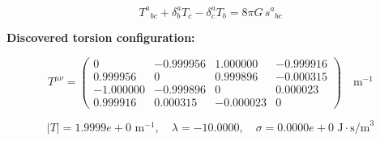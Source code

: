 
\begin{equation}
  T^a{}_{bc} + \delta^a_b T_c - \delta^a_c T_b = 8\pi G \, s^a{}_{bc}
\end{equation}

\textbf{Discovered torsion configuration:}

\begin{equation}
  T^{\mu\nu} = \begin{pmatrix}
    0 & -0.999956 & 1.000000 & -0.999916 \\
    0.999956 & 0 & 0.999896 & -0.000315 \\
    -1.000000 & -0.999896 & 0 & 0.000023 \\
    0.999916 & 0.000315 & -0.000023 & 0
  \end{pmatrix} \quad \text{m}^{-1}
\end{equation}

\begin{equation}
  |T| = 1.9999e+0 \text{ m}^{-1}, \quad
  \lambda = -10.0000, \quad
  \sigma = 0.0000e+0 \text{ J}\cdot\text{s/m}^3
\end{equation}